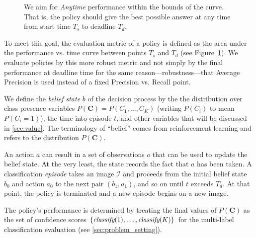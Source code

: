\documentclass[runningheads]{llncs}
\begin{document}
\begin{figure}[h!]
  \caption{We aim for \emph{Anytime} performance within the bounds of the curve. That is, the policy should give the best possible answer at any time from start time $T_s$ to deadline $T_d$.}
  \label{fig:evaluation}
\end{figure}

To meet this goal, the evaluation metric of a policy is defined as the area under the performance vs. time curve between points $T_s$ and $T_d$ (see Figure~\ref{fig:evaluation}).
We evaluate policies by this more robust metric and not simply by the final performance at deadline time for the same reason---robustness---that Average Precision is used instead of a fixed Precision vs. Recall point.

We define the \emph{belief state} $b$ of the decision process by the the distribution over class presence variables $P(\mathbf{C}) = P(C_1, \dots, C_K)$ (writing $P(C_i)$ to mean $P(C_i=1)$), the time into episode $t$, and other variables that will be discussed in \autoref{sec:value}.
The terminology of ``belief'' comes from reinforcement learning and refers to the distribution $P(\mathbf{C})$.

An action $a$ can result in a set of observations $o$ that can be used to update the belief state.
At the very least, the state records the fact that $a$ has been taken.
A classification \emph{episode} takes an image $\mathcal{I}$ and proceeds from the initial belief state $b_0$ and action $a_0$ to the next pair $(b_1,a_1)$, and so on until $t$ exceeds $T_d$.
At that point, the policy is terminated and a new episode begins on a new image.

The policy's performance is determined by treating the final values of $P(\mathbf{C})$ as the set of confidence scores $\{\emph{classify}(1), \dots, \emph{classify}(K)\}$ for the multi-label classification evaluation (see \autoref{sec:problem_setting}).
\end{document}
